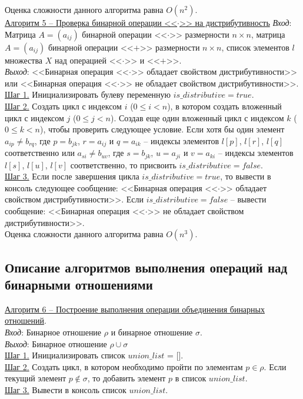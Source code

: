 \documentclass[bachelor, och, labwork]{shiza}
\begin{document}
            Оценка сложности данного алгоритма равна $O(n^2)$.\\
            
        \underline{Алгоритм 5 -- Проверка бинарной операции <<$\cdot$>> на дистрибутивность}
            \textit{Вход}: Матрица $A = (a_{ij})$ бинарной операции <<$\cdot$>> размерности $n \times n$, матрица $A = (a_{ij})$ бинарной 
            операции <<$+$>> размерности $n \times n$, список элементов $l$ множества $X$ над операцией <<$\cdot$>> и <<$+$>>.\\
            \textit{Выход}: <<Бинарная операция <<$\cdot$>> обладает свойством дистрибутивности>> или 
            <<Бинарная операция <<$\cdot$>> не обладает свойством дистрибутивности>>.\\
            \underline{Шаг 1.} Инициализировать булеву переменную $is\_distributive = true$.\\
            \underline{Шаг 2.} Создать цикл с индексом $i$ ($0 \leq i < n$), в котором создать вложенный цикл с индексом $j$ ($0 \leq j < n$).
            Создав еще один вложенный цикл с индексом $k$ ($0 \leq k < n$), чтобы проверить следующее условие. Если хотя бы один элемент 
            $a_{ip} \neq b_{rq}$, где $p = b_{jk}$, $r = a_{ij}$ и $q = a_{ik}$ -- индексы элементов $l[p]$, $l[r]$, $l[q]$ соответственно
            или $a_{si} \neq b_{uv}$, где $s = b_{jk}$, $u = a_{ji}$ и $v = a_{ki}$ -- индексы элементов $l[s]$, $l[u]$, $l[v]$ соответственно, то присвоить 
            $is\_distributive = false$.\\
            \underline{Шаг 3.} Если после завершения цикла $is\_distributive = true$, то вывести в консоль следующее сообщение:
            <<Бинарная операция <<$\cdot$>> обладает свойством дистрибутивности>>. Если $is\_distributive = false$ -- вывести сообщение:
            <<Бинарная операция <<$\cdot$>> не обладает свойством дистрибутивности>>.\\
            
            Оценка сложности данного алгоритма равна $O(n^3)$.\\
        
    \subsection{Описание алгоритмов выполнения операций над бинарными отношениями}
        \underline{Алгоритм 6 -- Построение выполнения операции объединения бинарных отношений}.\\
            \textit{Вход}: Бинарное отношение $\rho$ и бинарное отношение $\sigma$.\\
            \textit{Выход}: Бинарное отношение $\rho \cup \sigma$\\
            \underline{Шаг 1.} Инициализировать список $union\_list$ = []. \\
            \underline{Шаг 2.} Создать цикл, в котором необходимо пройти по элементам $p \in \rho$. Если текущий элемент $p \notin \sigma$, то
            добавить элемент $p$ в список $union\_list$. \\  
            \underline{Шаг 3.} Вывести в консоль список $union\_list$.\\
            
\end{document}
